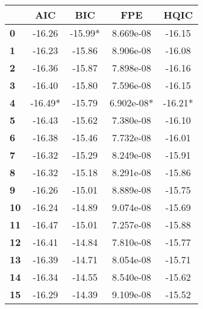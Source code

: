 \begin{center}
\begin{tabular}{lcccc}
\toprule
            & \textbf{AIC} & \textbf{BIC} & \textbf{FPE} & \textbf{HQIC}  \\
\midrule
\textbf{0}  &      -16.26  &     -15.99*  &   8.669e-08  &       -16.15   \\
\textbf{1}  &      -16.23  &      -15.86  &   8.906e-08  &       -16.08   \\
\textbf{2}  &      -16.36  &      -15.87  &   7.898e-08  &       -16.16   \\
\textbf{3}  &      -16.40  &      -15.80  &   7.596e-08  &       -16.15   \\
\textbf{4}  &     -16.49*  &      -15.79  &  6.902e-08*  &      -16.21*   \\
\textbf{5}  &      -16.43  &      -15.62  &   7.380e-08  &       -16.10   \\
\textbf{6}  &      -16.38  &      -15.46  &   7.732e-08  &       -16.01   \\
\textbf{7}  &      -16.32  &      -15.29  &   8.249e-08  &       -15.91   \\
\textbf{8}  &      -16.32  &      -15.18  &   8.291e-08  &       -15.86   \\
\textbf{9}  &      -16.26  &      -15.01  &   8.889e-08  &       -15.75   \\
\textbf{10} &      -16.24  &      -14.89  &   9.074e-08  &       -15.69   \\
\textbf{11} &      -16.47  &      -15.01  &   7.257e-08  &       -15.88   \\
\textbf{12} &      -16.41  &      -14.84  &   7.810e-08  &       -15.77   \\
\textbf{13} &      -16.39  &      -14.71  &   8.054e-08  &       -15.71   \\
\textbf{14} &      -16.34  &      -14.55  &   8.540e-08  &       -15.62   \\
\textbf{15} &      -16.29  &      -14.39  &   9.109e-08  &       -15.52   \\
\bottomrule
\end{tabular}
\end{center}